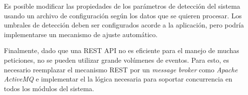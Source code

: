 \documentclass[a4paper,10pt, oneside]{article}
\begin{document}
Es posible modificar las propiedades de los parámetros de detección del sistema usando un archivo de configuración según los datos que se quieren procesar. Los umbrales de detección deben ser configurados acorde a la aplicación, pero podría implementarse un mecanismo de ajuste automático.

Finalmente, dado que una REST API no es eficiente para el manejo de muchas peticiones, no se pueden utilizar grande volúmenes de eventos. Para esto, es necesario reemplazar el mecanismo REST por un \textit{message broker} como \textit{Apache ActiveMQ} e implementar el la lógica necesaria para soportar concurrencia en todos los módulos del sistema.


\newpage

\nocite{*}
\printbibliography
\end{document}
